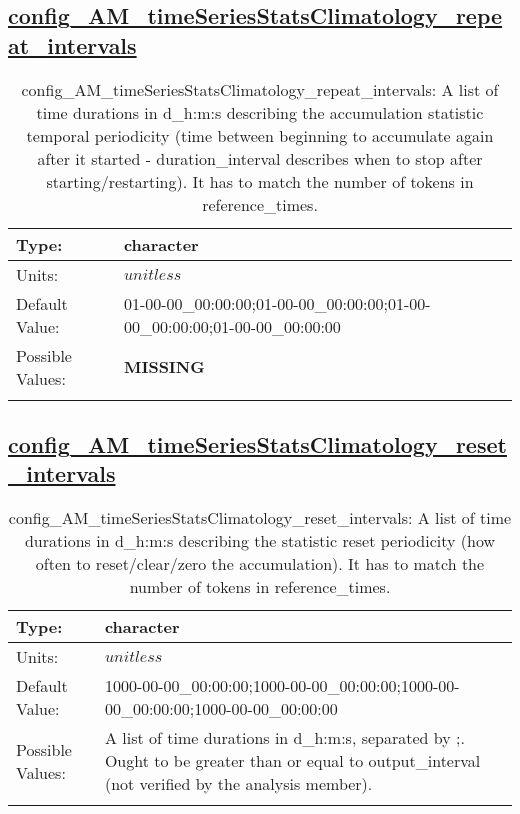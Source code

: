 \subsection[config\_AM\_timeSeriesStatsClimatology\_repeat\_intervals]{\hyperref[sec:nm_tab_AM_timeSeriesStatsClimatology]{config\_AM\_timeSeriesStatsClimatology\_repeat\_intervals}}
\label{subsec:nm_sec_config_AM_timeSeriesStatsClimatology_repeat_intervals}
\begin{center}
\begin{longtable}{| p{2.0in} || p{4.0in} |}
    \hline
    Type: & character \\
    \hline
    Units: & $unitless$ \\
    \hline
    Default Value: & 01-00-00\_00:00:00;01-00-00\_00:00:00;01-00-00\_00:00:00;01-00-00\_00:00:00 \\
    \hline
    Possible Values: & {\bf \color{red} MISSING} \\
    \hline
    \caption{config\_AM\_timeSeriesStatsClimatology\_repeat\_intervals: A list of time durations in d\_h:m:s describing the accumulation statistic temporal periodicity (time between beginning to accumulate again after it started - duration\_interval describes when to stop after starting/restarting). It has to match the number of tokens in reference\_times.}
\end{longtable}
\end{center}
\subsection[config\_AM\_timeSeriesStatsClimatology\_reset\_intervals]{\hyperref[sec:nm_tab_AM_timeSeriesStatsClimatology]{config\_AM\_timeSeriesStatsClimatology\_reset\_intervals}}
\label{subsec:nm_sec_config_AM_timeSeriesStatsClimatology_reset_intervals}
\begin{center}
\begin{longtable}{| p{2.0in} || p{4.0in} |}
    \hline
    Type: & character \\
    \hline
    Units: & $unitless$ \\
    \hline
    Default Value: & 1000-00-00\_00:00:00;1000-00-00\_00:00:00;1000-00-00\_00:00:00;1000-00-00\_00:00:00 \\
    \hline
    Possible Values: & A list of time durations in d\_h:m:s, separated by ;. Ought to be greater than or equal to output\_interval (not verified by the analysis member). \\
    \hline
    \caption{config\_AM\_timeSeriesStatsClimatology\_reset\_intervals: A list of time durations in d\_h:m:s describing the statistic reset periodicity (how often to reset/clear/zero the accumulation). It has to match the number of tokens in reference\_times.}
\end{longtable}
\end{center}
